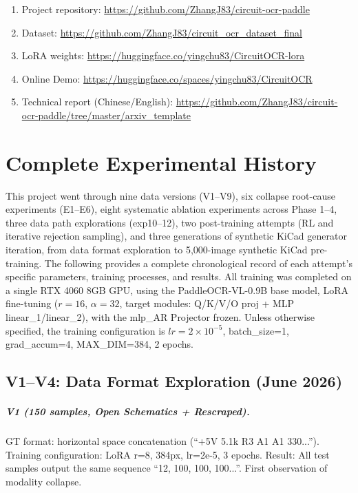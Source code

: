 \begin{enumerate}[nosep]
    \item Project repository: \url{https://github.com/ZhangJ83/circuit-ocr-paddle}
    \item Dataset: \url{https://github.com/ZhangJ83/circuit_ocr_dataset_final}
    \item LoRA weights: \url{https://huggingface.co/yingchu83/CircuitOCR-lora}
    \item Online Demo: \url{https://huggingface.co/spaces/yingchu83/CircuitOCR}
    \item Technical report (Chinese/English): \url{https://github.com/ZhangJ83/circuit-ocr-paddle/tree/master/arxiv_template}
\end{enumerate}

\appendix
\section{Complete Experimental History}

This project went through nine data versions (V1--V9), six collapse root-cause experiments (E1--E6), eight systematic ablation experiments across Phase 1--4, three data path explorations (exp10--12), two post-training attempts (RL and iterative rejection sampling), and three generations of synthetic KiCad generator iteration, from data format exploration to 5,000-image synthetic KiCad pre-training. The following provides a complete chronological record of each attempt's specific parameters, training processes, and results. All training was completed on a single RTX 4060 8GB GPU, using the PaddleOCR-VL-0.9B base model, LoRA fine-tuning ($r=16$, $\alpha=32$, target modules: Q/K/V/O proj + MLP linear\_1/linear\_2), with the mlp\_AR Projector frozen. Unless otherwise specified, the training configuration is $lr=2\times10^{-5}$, batch\_size=1, grad\_accum=4, MAX\_DIM=384, 2 epochs.

\subsection{V1--V4: Data Format Exploration (June 2026)}

\subparagraph{V1 (150 samples, Open Schematics + Rescraped).}
GT format: horizontal space concatenation (``+5V 5.1k R3 A1 A1 330...''). Training configuration: LoRA r=8, 384px, lr=2e-5, 3 epochs.
Result: All test samples output the same sequence ``12, 100, 100, 100...''. First observation of modality collapse.

